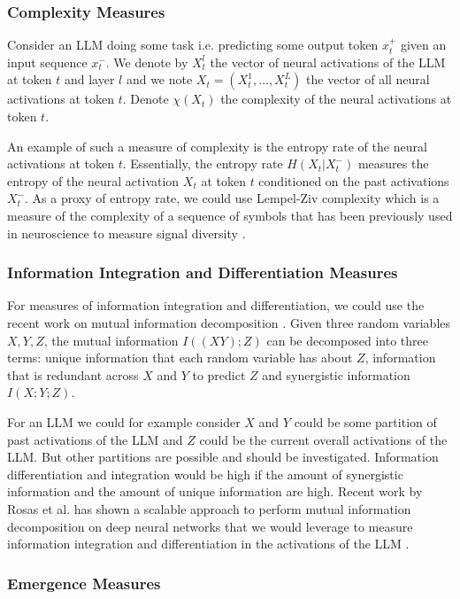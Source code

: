 \documentclass[11pt,a4paper]{article}
\begin{document}
\subsubsection{Complexity Measures}

Consider an LLM doing some task i.e. predicting some output token $x_t^+$ given an input sequence $x_t^-$. We denote by $X_t^l$ the vector of neural activations of the LLM at token $t$ and layer $l$ and we note $X_t = (X_t^1, \ldots, X_t^L)$ the vector of all neural activations at token $t$. Denote $\chi(X_t)$ the complexity of the neural activations at token $t$. 

An example of such a measure of complexity is the entropy rate of the neural activations at token $t$. Essentially, the entropy rate $H(X_t | X_t^-)$ measures the entropy of the neural activation $X_t$ at token $t$ conditioned on the past activations $X_t^-$. As a proxy of entropy rate, we could use Lempel-Ziv complexity which is a measure of the complexity of a sequence of symbols that has been previously used in neuroscience to measure signal diversity \citep{Schartner2015}.

\subsubsection{Information Integration and Differentiation Measures}

For measures of information integration and differentiation, we could use the recent work on mutual information decomposition \citep{Williams2010, Rosas2024}. Given three random variables $X, Y, Z$, the mutual information $I((X Y);Z)$ can be decomposed into three terms: unique information that each random variable has about $Z$, information that is redundant across $X$ and $Y$ to predict $Z$ and synergistic information $I(X; Y; Z)$. 

For an LLM we could for example consider $X$ and $Y$ could be some partition of past activations of the LLM and $Z$ could be the current overall activations of the LLM. But other partitions are possible and should be investigated. Information differentiation and integration would be high if the amount of synergistic information and the amount of unique information are high. Recent work by Rosas et al. has shown a scalable approach to perform mutual information decomposition on deep neural networks that we would leverage to measure information integration and differentiation in the activations of the LLM \citep{Rosas2024}.

\subsubsection{Emergence Measures}
\end{document}
